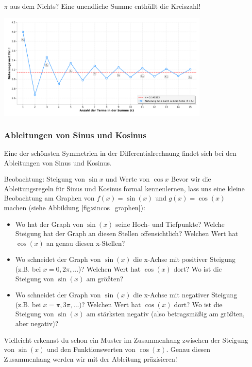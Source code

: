 \begin{funfactbox}{$\pi$ aus dem Nichts? Eine unendliche Summe enthüllt die Kreiszahl!}
\begin{center}
    \includegraphics[width=0.8\textwidth]{grafiken/Pi_Leibniz_Reihe.png}
    \label{fig:pi_leibniz_funfact}
\end{center}
\end{funfactbox}

\subsubsection{Ableitungen von Sinus und Kosinus}
Eine der schönsten Symmetrien in der Differentialrechnung findet sich bei den Ableitungen von Sinus und Kosinus.

\begin{infoboxumgebung}{Beobachtung: Steigung von $\sin x$ und Werte von $\cos x$}
Bevor wir die Ableitungsregeln für Sinus und Kosinus formal kennenlernen, lass uns eine kleine Beobachtung am Graphen von $f(x)=\sin(x)$ und $g(x)=\cos(x)$ machen (siehe Abbildung \ref{fig:sincos_graphen}):
\begin{itemize}
    \item Wo hat der Graph von $\sin(x)$ seine Hoch- und Tiefpunkte? Welche Steigung hat der Graph an diesen Stellen offensichtlich? Welchen Wert hat $\cos(x)$ an genau diesen x-Stellen?
    \item Wo schneidet der Graph von $\sin(x)$ die x-Achse mit positiver Steigung (z.B. bei $x=0, 2\pi, \dots$)? Welchen Wert hat $\cos(x)$ dort? Wo ist die Steigung von $\sin(x)$ am größten?
    \item Wo schneidet der Graph von $\sin(x)$ die x-Achse mit negativer Steigung (z.B. bei $x=\pi, 3\pi, \dots$)? Welchen Wert hat $\cos(x)$ dort? Wo ist die Steigung von $\sin(x)$ am stärksten negativ (also betragsmäßig am größten, aber negativ)?
\end{itemize}
Vielleicht erkennst du schon ein Muster im Zusammenhang zwischen der Steigung von $\sin(x)$ und den Funktionswerten von $\cos(x)$. Genau diesen Zusammenhang werden wir mit der Ableitung präzisieren!
\end{infoboxumgebung}

